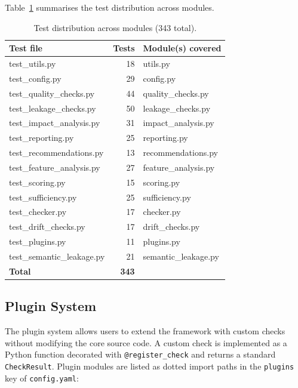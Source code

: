 \documentclass[12pt,a4paper]{report}
\newcommand{\tblhead}{\rowcolor{tblHeadBg}\color{white}\bfseries}
\begin{document}
Table~\ref{tab:tests} summarises the test distribution across modules.

\begin{table}[!ht]
\centering
\caption{Test distribution across modules (343 total).}
\label{tab:tests}
\scriptsize
{}
\begin{tabular}{lrl}
\toprule
\tblhead \textbf{Test file} & \textbf{Tests} & \textbf{Module(s) covered} \\
\midrule
test\_utils.py          & 18 & utils.py \\
test\_config.py         & 29 & config.py \\
test\_quality\_checks.py & 44 & quality\_checks.py \\
test\_leakage\_checks.py & 50 & leakage\_checks.py \\
test\_impact\_analysis.py & 31 & impact\_analysis.py \\
test\_reporting.py       & 25 & reporting.py \\
test\_recommendations.py & 13 & recommendations.py \\
test\_feature\_analysis.py & 27 & feature\_analysis.py \\
test\_scoring.py         & 15 & scoring.py \\
test\_sufficiency.py     & 25 & sufficiency.py \\
test\_checker.py         & 17 & checker.py \\
test\_drift\_checks.py   & 17 & drift\_checks.py \\
test\_plugins.py         & 11 & plugins.py \\
test\_semantic\_leakage.py & 21 & semantic\_leakage.py \\
\midrule
\textbf{Total}           & \textbf{343} & \\
\bottomrule
\end{tabular}
\end{table}

\subsection{Plugin System}

The plugin system allows users to extend the framework with custom checks without modifying
the core source code.  A custom check is implemented as a Python function decorated with
\texttt{@register\_check} and returns a standard \texttt{CheckResult}.  Plugin modules
are listed as dotted import paths in the \texttt{plugins} key of \texttt{config.yaml}:
\end{document}
